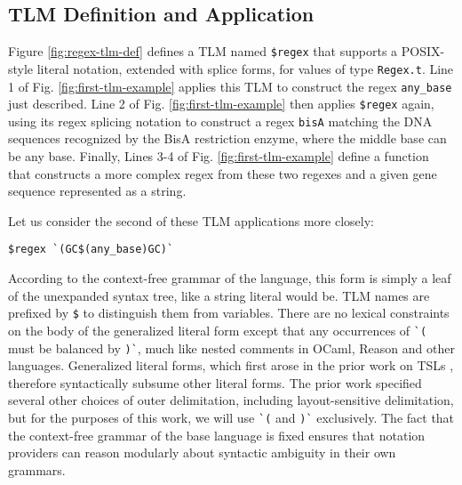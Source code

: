 \documentclass[acmsmall,review,anonymous]{acmart}\settopmatter{printfolios=true,printccs=false,printacmref=false}
\newcommand{\li}[1]{\lstinline[basicstyle=\ttfamily\fontsize{9pt}{1em}\selectfont]{#1}}
\begin{document}



\vspace{-3px}
\subsection{TLM Definition and Application}
Figure \ref{fig:regex-tlm-def} defines a TLM named \li{$regex} that supports a POSIX-style literal notation, extended with splice forms, for values of type \li{Regex.t}. Line 1 of Fig. \ref{fig:first-tlm-example} applies this TLM to construct the regex \li{any_base} just described. Line 2 of Fig. \ref{fig:first-tlm-example} then applies \li{$regex} again, using its regex splicing notation to construct a regex \li{bisA} matching the DNA sequences recognized by the BisA restriction enzyme, where the middle base can be any base. Finally, Lines 3-4 of Fig. \ref{fig:first-tlm-example} define a function that constructs a more complex regex from these two regexes and a given gene sequence represented as a string. 

Let us consider the second of these TLM applications more closely:
\begin{lstlisting}[numbers=none]
    $regex `(GC$(any_base)GC)`
\end{lstlisting}
According to the context-free grammar of the language, this form is simply a leaf of the unexpanded syntax tree, like a string literal would be. TLM names are prefixed by \li{$} 
 to distinguish them from variables. There are no lexical constraints on the body of the generalized literal form except that any occurrences of \li{`(} must be balanced by \li{)`}, much like nested comments in OCaml, Reason and other languages. Generalized literal forms, which first arose in the prior work on TSLs \cite{TSLs}, therefore syntactically subsume other literal forms. The prior work specified several other choices of outer delimitation, including layout-sensitive delimitation, but for the purposes of this work, we will use \li{`(} and \li{)`} exclusively. The fact that the context-free grammar of the base language is fixed ensures that notation providers can reason modularly about syntactic ambiguity in their own grammars.
\end{document}
